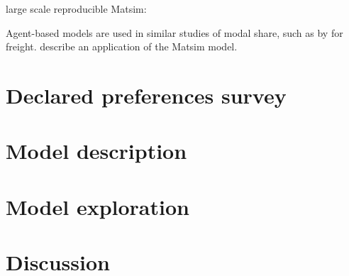 \documentclass[3p,times,procedia]{elsarticle}
\begin{document}
large scale reproducible Matsim: \cite{horl2020reproducible}


Agent-based models are used in similar studies of modal share, such as by \cite{baindur2011agent} for freight. \cite{raney2003agent} describe an application of the Matsim model.

\section{Declared preferences survey}


\section{Model description}


\section{Model exploration}


\section{Discussion}




%



\clearpage
\end{document}
